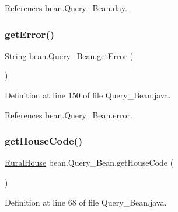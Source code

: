 References bean.\+Query\+\_\+\+Bean.\+day.

\mbox{\label{classbean_1_1Query__Bean_a008055cfab609b48b5c3e74ddc26303c}} 
\subsubsection{\texorpdfstring{getError()}{getError()}}
{\footnotesize\ttfamily String bean.\+Query\+\_\+\+Bean.\+get\+Error (\begin{DoxyParamCaption}{ }\end{DoxyParamCaption})}



Definition at line 150 of file Query\+\_\+\+Bean.\+java.


\begin{DoxyCode}{0}

\end{DoxyCode}


References bean.\+Query\+\_\+\+Bean.\+error.

\mbox{\label{classbean_1_1Query__Bean_a82506db8f6c6211fb6ad55310c63d0b6}} 
\subsubsection{\texorpdfstring{getHouseCode()}{getHouseCode()}}
{\footnotesize\ttfamily \mbox{\hyperlink{classdomain_1_1RuralHouse}{Rural\+House}} bean.\+Query\+\_\+\+Bean.\+get\+House\+Code (\begin{DoxyParamCaption}{ }\end{DoxyParamCaption})}



Definition at line 68 of file Query\+\_\+\+Bean.\+java.


\begin{DoxyCode}{0}

\end{DoxyCode}


